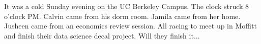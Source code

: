 \documentclass{article}
\begin{document}
It was a cold Sunday evening on the UC Berkeley Campus. The clock struck 8 o'clock PM. Calvin came from his dorm room. Jamila came from her home. Jusheen came from an economics review session. All racing to meet up in Moffitt and finish their data science decal project. Will they finish it...
\end{document}
